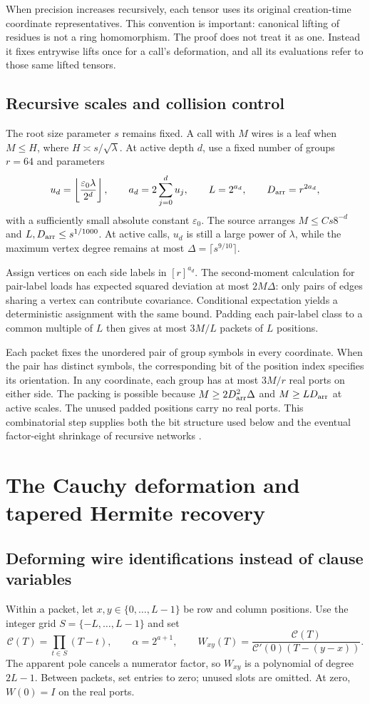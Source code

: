\documentclass[11pt,a4paper]{article}
\numberwithin{equation}{section}
\theoremstyle{definition}
\theoremstyle{remark}
\newcommand{\eps}{\varepsilon}
\begin{document}
When precision increases recursively, each tensor uses its original
creation-time coordinate representatives. This convention is important:
canonical lifting of residues is not a ring homomorphism. The proof does
not treat it as one. Instead it fixes entrywise lifts once for a call's
deformation, and all its evaluations refer to those same lifted tensors.

\subsection{Recursive scales and collision control}
The root size parameter $s$ remains fixed. A call with $M$ wires is a leaf
when $M\le H$, where $H\asymp s/\sqrt\lambda$. At active depth $d$, use a
fixed number of groups $r=64$ and parameters
\[
 u_d=\left\lfloor\frac{\eps_0\lambda}{2^d}\right\rfloor,
 \qquad a_d=2\sum_{j=0}^du_j,
 \qquad L=2^{a_d},\qquad D_{\rm arr}=r^{2a_d},
\]
with a sufficiently small absolute constant $\eps_0$.
The source arranges $M\le Cs8^{-d}$ and
$L,D_{\rm arr}\le s^{1/1000}$. At active calls, $u_d$ is still a large power
of $\lambda$, while the maximum vertex degree remains at most
$\Delta=\lceil s^{9/10}\rceil$.

Assign vertices on each side labels in $[r]^{a_d}$. The second-moment
calculation for pair-label loads has expected squared deviation at most
$2M\Delta$: only pairs of edges sharing a vertex can contribute covariance.
Conditional expectation yields a deterministic assignment with the same
bound. Padding each pair-label class to a common multiple of $L$ then gives
at most $3M/L$ packets of $L$ positions.

Each packet fixes the unordered pair of group symbols in every coordinate.
When the pair has distinct symbols, the corresponding bit of the position
index specifies its orientation. In any coordinate, each group has at most
$3M/r$ real ports on either side. The packing is possible because
$M\ge2D_{\rm arr}^2\Delta$ and $M\ge LD_{\rm arr}$ at active scales.
The unused padded positions carry no real ports. This combinatorial step
supplies both the bit structure used below and the eventual factor-eight
shrinkage of recursive networks \cite{quant-contraction}.

\section{The Cauchy deformation and tapered Hermite recovery}
\label{sec:cauchy}
\subsection{Deforming wire identifications instead of clause variables}
Within a packet, let $x,y\in\{0,\ldots,L-1\}$ be row and column positions.
Use the integer grid $S=\{-L,\ldots,L-1\}$ and set
\[
 \mathcal C(T)=\prod_{t\in S}(T-t),\qquad \alpha=2^{a+1},\qquad
 W_{xy}(T)=\frac{\mathcal C(T)}{\mathcal C'(0)(T-(y-x))}.
\]
The apparent pole cancels a numerator factor, so $W_{xy}$ is a polynomial
of degree $2L-1$. Between packets, set entries to zero; unused slots are
omitted. At zero, $W(0)=I$ on the real ports.
\end{document}
